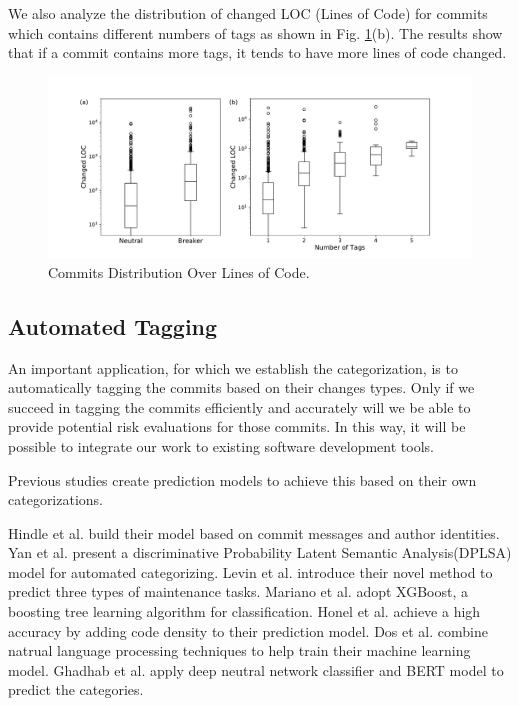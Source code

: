 We also analyze the distribution of changed LOC (Lines of Code) for commits which contains different numbers of tags as shown in Fig. \ref{fig: commit_LOC}(b).
The results show that if a commit contains more tags, it tends to have more lines of code changed. 
\begin{figure}[htbp]
\centerline{\includegraphics[scale=0.5]{figures/commit_size.pdf}}
\caption{Commits Distribution Over Lines of Code.}
\label{fig: commit_LOC}
\end{figure}

\subsection{Automated Tagging}
An important application, for which we establish the categorization, is to automatically tagging the commits based on their changes types.
Only if we succeed in tagging the commits efficiently and accurately will we be able to provide potential risk evaluations for those commits. 
In this way, it will be possible to integrate our work to existing software development tools.

Previous studies create prediction models to achieve this based on their own categorizations.

Hindle et al. \cite{Hindle_auto} build their model based on commit messages and author identities.
Yan et al. \cite{yan2016automatically} present a discriminative Probability Latent Semantic Analysis(DPLSA) model for automated categorizing. 
Levin et al. \cite{levin2017boosting} introduce their novel method to predict three types of maintenance tasks. 
Mariano et al. \cite{mariano2019feature} adopt XGBoost, a boosting tree learning algorithm for classification.
Honel et al. \cite{honel2019importance} achieve a high accuracy by adding code density to their prediction model.
Dos et al. \cite{dos2020commit} combine natrual language processing techniques to help train their machine learning model.
Ghadhab et al. \cite{ghadhab2021augmenting} apply deep neutral network classifier and BERT model to predict the categories.

